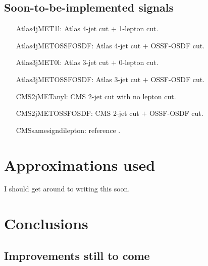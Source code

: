\documentclass[10pt]{article}
\begin{document}
\subsection{Soon-to-be-implemented signals}
\label{subsec:soonSignals}

\begin{itemize}

\item[Atlas4jMET1l:] Atlas 4-jet cut $+$ 1-lepton cut.

\item[Atlas4jMETOSSFOSDF:] Atlas 4-jet cut $+$ OSSF-OSDF cut.

\item[Atlas3jMET0l:] Atlas 3-jet cut $+$ 0-lepton cut.

\item[Atlas3jMETOSSFOSDF:] Atlas 3-jet cut $+$ OSSF-OSDF cut.

\item[CMS2jMETanyl:] CMS 2-jet cut with no lepton cut.

\item[CMS2jMETOSSFOSDF:] CMS 2-jet cut $+$ OSSF-OSDF cut.

\item[CMSsamesigndilepton:] reference \cite{Chatrchyan:2011wba}.

\end{itemize}


\section{Approximations used}
\label{sec:approximations}

I should get around to writing this soon.


\section{Conclusions}
\label{sec:conclusions}


\begin{appendix}

\section{Improvements still to come}
\label{app:improvements}


\end{appendix}


\end{document}
